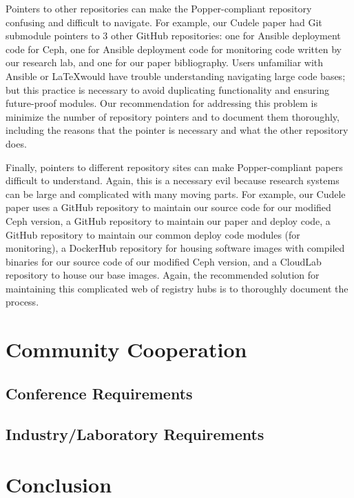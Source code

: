 Pointers to other repositories can make the Popper-compliant repository
confusing and difficult to navigate. For example, our Cudele paper had Git
submodule pointers to 3 other GitHub repositories: one for Ansible deployment
code for Ceph, one for Ansible deployment code for monitoring code written by
our research lab, and one for our paper bibliography. Users unfamiliar with
Ansible or \LaTeX would have trouble understanding navigating large code bases;
but this practice is necessary to avoid duplicating functionality and ensuring
future-proof modules. Our recommendation for addressing this problem is
minimize the number of repository pointers and to document them thoroughly,
including the reasons that the pointer is necessary and what the other
repository does.

Finally, pointers to different repository sites can make Popper-compliant
papers difficult to understand. Again, this is a necessary evil because
research systems can be large and complicated with many moving parts. For
example, our Cudele paper uses a GitHub repository to maintain our source code
for our modified Ceph version, a GitHub repository to maintain our paper and
deploy code, a GitHub repository to maintain our common deploy code modules
(for monitoring), a DockerHub repository for housing software images with
compiled binaries for our source code of our modified Ceph version, and a
CloudLab repository to house our base images. Again, the recommended solution
for maintaining this complicated web of registry hubs is to thoroughly document
the process.


\section{Community Cooperation}

\subsection{Conference Requirements}

\subsection{Industry/Laboratory Requirements}

\section{Conclusion}
